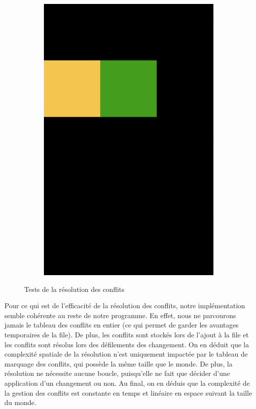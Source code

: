\begin{figure}[ht]
\begin{subfigure}{0.2\textwidth}
        \includegraphics[width=\textwidth]{TestConflict4.png}
        \label{fig:TestConflict4}
    \end{subfigure}
    \caption{Tests de la résolution des conflits}
    \label{fig:TestConflict}
\end{figure}

Pour ce qui est de l'efficacité de la résolution des conflits, notre implémentation semble cohérente au reste de notre programme. En effet, nous ne parcourons jamais le tableau des conflits en entier (ce qui permet de garder les avantages temporaires de la file). De plus, les conflits sont stockés lors de l'ajout à la file et les conflits sont résolus lors des défilements des changement. On en déduit que la complexité spatiale de la résolution n'est uniquement impactée par le tableau de marquage des conflits, qui possède la même taille que le monde. De plus, la résolution ne nécessite aucune boucle, puisqu'elle ne fait que décider d'une application d'un changement ou non. Au final, on en déduis que la complexité de la gestion des conflits est constante en temps et linéaire en espace suivant la taille du monde.